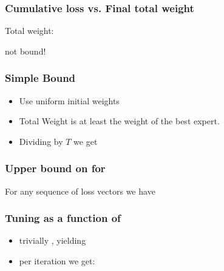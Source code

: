 \documentclass{beamer}
\begin{document}
\begin{frame}
\frametitle{Cumulative loss vs. Final total weight}

 Total weight: 

 
 
\R{\[
\onslide<8-> -\log W^{T+1} =
\onslide<6-> -\log \frac{W^{T+1}}{W^1} = -\sum_{t=1}^T \log p_A^t(c^t)
\onslide<7-> = L_A^T
\]}
  not bound!
\end{frame}

\begin{frame}
\frametitle{Simple Bound}
\begin{itemize}
\item Use uniform initial weights 
\item Total Weight is at least the weight of the best expert.
\item Dividing by $T$ we get
\end{itemize}
\end{frame}

\begin{frame}
\frametitle{Upper bound on  for \ouralg}
\begin{lemma} 
For any sequence of loss vectors 
we have
\end{lemma}
\end{frame}

\begin{frame}
\frametitle{Tuning \R{$\eta$} as a function of }
\begin{itemize}
\item trivially , yielding
\item per iteration we get:
\end{itemize}
\end{frame}
\end{document}
